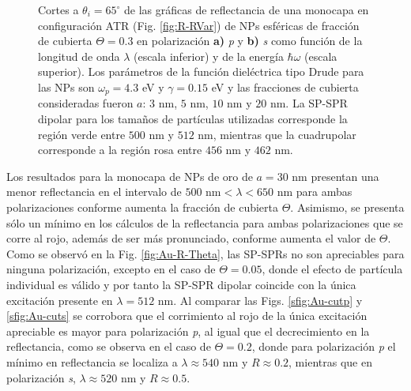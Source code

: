\begin{figure}[h!]
	\caption{Cortes a $\theta_i = 65^\circ$ de las gráficas de reflectancia de una monocapa en configuración ATR (Fig. \ref{fig:R-RVar}) de NPs esféricas de fracción de cubierta $\Theta = 0.3$ en polarización \textbf{a)} \emph{p} y \textbf{b)} \emph{s} como función de la longitud de onda $\lambda$ (escala inferior) y de la energía $\hbar\omega$ (escala superior). Los parámetros de la función dieléctrica tipo Drude para las NPs son $\omega_p = 4.3$ eV y $\gamma = 0.15$ eV y las fracciones de cubierta consideradas fueron $a$: $3$ nm, $5$ nm, $10$ nm y $20$ nm. La SP-SPR dipolar para los tamaños de partículas utilizadas corresponde la región verde entre $500$ nm y $512$ nm, mientras que la cuadrupolar corresponde a la región rosa entre $456$ nm y $462$ nm.}\label{fig:AuAg-Cuts}
	\end{figure}	

Los resultados para la monocapa de NPs de oro de $a=30$ nm presentan una menor reflectancia en el intervalo de $500$ nm$<\lambda<650$ nm para ambas polarizaciones conforme aumenta la fracción de cubierta $\Theta$. Asimismo, se presenta sólo un mínimo en los cálculos de la reflectancia para ambas polarizaciones que se corre al rojo, además de ser más pronunciado, conforme aumenta el valor de $\Theta$. Como se observó en la Fig. \ref{fig:Au-R-Theta}, las SP-SPRs no son apreciables para ninguna polarización, excepto en el caso de $\Theta =0.05$, donde el efecto de partícula individual es válido y por tanto la SP-SPR dipolar coincide con la única excitación presente en $\lambda = 512$ nm. Al comparar las Figs. \ref{sfig:Au-cutp} y \ref{sfig:Au-cuts} se corrobora que el corrimiento al rojo de la única excitación apreciable  es mayor para polarización \emph{p}, al igual que el decrecimiento en la reflectancia, como se observa en el caso de $\Theta=0.2$, donde para polarización \emph{p} el mínimo en reflectancia se localiza a $\lambda\approx  540$ nm  y $R \approx 0.2$, mientras que en polarización \emph{s}, $\lambda\approx 520$ nm y $R\approx 0.5$.

